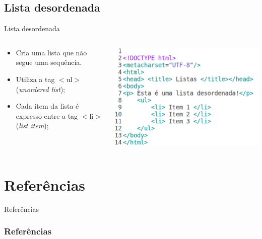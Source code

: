 \documentclass{beamer}
\begin{document}
\subsection{Lista desordenada}
\begin{frame}{Lista desordenada}
  \begin{columns}
    \begin{column}{0.45 \textwidth}
     \begin{itemize}
      \item Cria uma lista que não segue uma sequência.
       \item Utiliza a tag $<$ul$>$ (\textit{unordered list});
       \item Cada item da lista é expresso entre a tag $<$li$>$ 
      (\textit{list item});
     \end{itemize}
    \end{column}
    \begin{column}{0.5\textwidth}
     \includegraphics[height=0.45\paperheight]{fig/aula1/html3.png}
    \end{column}
  \end{columns}
\end{frame}

\section{Referências}
\begin{frame}{Referências}%
\frametitle{Referências}
\small
\begin{center}
\tiny


\end{center}
\end{frame}
\end{document}
